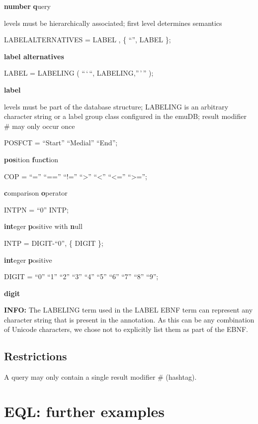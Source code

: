 \documentclass[]{book}
\begin{document}
\textbf{number} \textbf{q}uery

levels must be hierarchically associated; first level determines semantics

LABELALTERNATIVES = LABEL , \{ ``\textbar{}'', LABEL \};

\textbf{label alternatives}

LABEL = LABELING \textbar{} ( ``\,`\,``, LABELING,''\,'\,'' );

\textbf{label}

levels must be part of the database structure; LABELING is an arbitrary character string or a label group class configured in the emuDB; result modifier \# may only occur once

POSFCT = ``Start'' \textbar{} ``Medial'' \textbar{} ``End'';

\textbf{pos}ition \textbf{f}un\textbf{ct}ion

COP = ``='' \textbar{} ``=='' \textbar{} ``!='' \textbar{} ``\textgreater{}'' \textbar{} ``\textless{}'' \textbar{} ``\textless{}='' \textbar{} ``\textgreater{}='';

\textbf{c}omparison \textbf{o}perator

INTPN = ``0'' \textbar{} INTP;

\textbf{int}eger \textbf{p}ositive with \textbf{n}ull

INTP = DIGIT-``0'', \{ DIGIT \};

\textbf{int}eger \textbf{p}ositive

DIGIT = ``0'' \textbar{} ``1'' \textbar{} ``2'' \textbar{} ``3'' \textbar{} ``4'' \textbar{} ``5'' \textbar{} ``6'' \textbar{} ``7'' \textbar{} ``8'' \textbar{} ``9'';

\textbf{digit}

\textbf{INFO:} The LABELING term used in the LABEL EBNF term can represent any character string that is present in the annotation. As this can be any combination of Unicode characters, we chose not to explicitly list them as part of the EBNF.

\hypertarget{restrictions}{%
\section{Restrictions}\label{restrictions}}

A query may only contain a single result modifier \# (hashtag).

\hypertarget{app-chap:eql}{%
\chapter{EQL: further examples}\label{app-chap:eql}}
\end{document}
